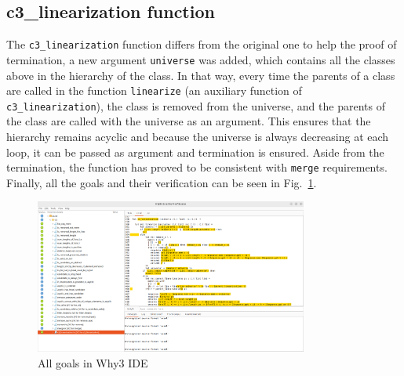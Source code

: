 \documentclass[runningheads]{llncs}
\begin{document}
\subsection{c3\_linearization function}
The \texttt{c3\_linearization} function differs from the original one to help the proof of termination, a new argument \texttt{universe} was added, which contains all the classes above in the hierarchy of the class.
In that way, every time the parents of a class are called in the function \texttt{linearize} (an auxiliary function of \texttt{c3\_linearization}), the class is removed from the universe, and the parents of the class are called with the universe as an argument.
This ensures that the hierarchy remains acyclic and because the universe is always decreasing at each loop, it can be passed as argument and termination is ensured.
Aside from the termination, the function has proved to be consistent with \texttt{merge} requirements.\\
Finally, all the goals and their verification can be seen in Fig.~\ref{fig:Why3C3}.
\begin{figure}[htbp]
  \centering
  \includegraphics[width=0.8\textwidth]{images/Why3C3.png}
  \caption{All goals in Why3 IDE}
  \label{fig:Why3C3}
\end{figure}
\end{document}
